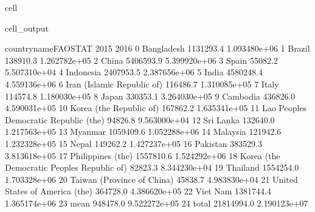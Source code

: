 \documentclass[letterpaper,10pt,english]{jupyterBook}
\begin{document}
\begin{sphinxuseclass}{cell}
\begin{sphinxVerbatimOutput}
\begin{sphinxuseclass}{cell_output}
\begin{sphinxVerbatim}[commandchars=\\\{\}]
                           country\PYGZus{}name\PYGZus{}FAOSTAT        2015          2016  \PYGZbs{}
0                                    Bangladesh   1131293.4  1.093480e+06   
1                                        Brazil    138910.3  1.262782e+05   
2                                         China   5406593.9  5.399920e+06   
3                                         Spain     55082.2  5.507310e+04   
4                                     Indonesia   2407953.5  2.387656e+06   
5                                         India   4580248.4  4.559136e+06   
6                    Iran (Islamic Republic of)    116486.7  1.310085e+05   
7                                         Italy    114574.8  1.180030e+05   
8                                         Japan    330353.1  3.264030e+05   
9                                      Cambodia    436826.0  4.590031e+05   
10                      Korea (the Republic of)    167862.2  1.635341e+05   
11       Lao People\PYGZsq{}s Democratic Republic (the)     94826.8  9.563000e+04   
12                                    Sri Lanka    132640.0  1.217563e+05   
13                                      Myanmar   1059409.6  1.052288e+06   
14                                     Malaysia    121942.6  1.232328e+05   
15                                        Nepal    149262.2  1.427237e+05   
16                                     Pakistan    383529.3  3.813618e+05   
17                            Philippines (the)   1557810.6  1.524292e+06   
18  Korea (the Democratic People\PYGZsq{}s Republic of)     82823.3  8.344230e+04   
19                                     Thailand   1554254.0  1.703328e+06   
20                   Taiwan (Province of China)     45838.7  4.983830e+04   
21               United States of America (the)    364728.0  4.386620e+05   
22                                     Viet Nam   1381744.4  1.365174e+06   
23                                         mean    948478.0  9.522272e+05   
24                                        total  21814994.0  2.190123e+07   


\end{sphinxVerbatim}
\end{sphinxuseclass}
\end{sphinxVerbatimOutput}
\end{sphinxuseclass}
\end{document}
